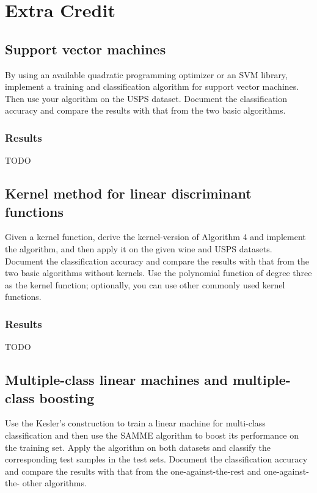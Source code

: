 \documentclass{article}
\begin{document}

\section{Extra Credit}
\subsection{Support vector machines}
By using an available quadratic programming optimizer or an SVM library, implement a training and classification algorithm for support vector machines. Then use your algorithm on the USPS dataset. Document the classification accuracy and compare the results with that from the two basic algorithms.

\subsubsection*{Results}
{\large TODO}


\subsection{Kernel method for linear discriminant functions}
Given a kernel function, derive the kernel-version of Algorithm 4 and implement the algorithm, and then apply it on the given wine and USPS datasets. Document the classification accuracy and compare the results with that from the two basic algorithms without kernels. Use the polynomial function of degree three as the kernel function; optionally, you can use other commonly used kernel functions.

\subsubsection*{Results}
{\large TODO}



\subsection{Multiple-class linear machines and multiple-class boosting}
Use the Kesler’s construction to train a linear machine for multi-class classification and then use the SAMME algorithm to boost its performance on the training set. Apply the algorithm on both datasets and classify the corresponding test samples in the test sets. Document the classification accuracy and compare the results with that from the one-against-the-rest and one-against-the- other algorithms.
\end{document}
